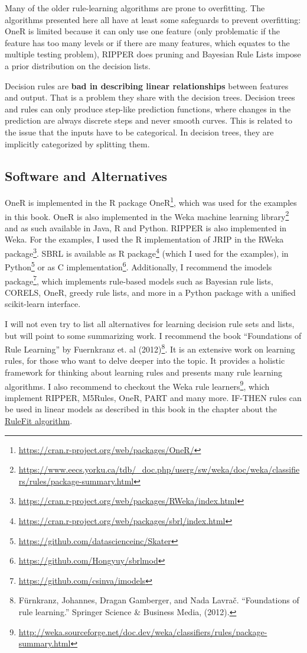 \documentclass[
  12pt,
]{krantz}
\renewcommand{\href}[2]{#2\footnote{\url{#1}}}
\begin{document}
Many of the older rule-learning algorithms are prone to overfitting.
The algorithms presented here all have at least some safeguards to prevent overfitting:
OneR is limited because it can only use one feature (only problematic if the feature has too many levels or if there are many features, which equates to the multiple testing problem), RIPPER does pruning and Bayesian Rule Lists impose a prior distribution on the decision lists.

Decision rules are \textbf{bad in describing linear relationships} between features and output.
That is a problem they share with the decision trees.
Decision trees and rules can only produce step-like prediction functions, where changes in the prediction are always discrete steps and never smooth curves.
This is related to the issue that the inputs have to be categorical.
In decision trees, they are implicitly categorized by splitting them.

\hypertarget{software-and-alternatives}{%
\subsection{Software and Alternatives}\label{software-and-alternatives}}

OneR is implemented in the \href{https://cran.r-project.org/web/packages/OneR/}{R package OneR}, which was used for the examples in this book.
OneR is also implemented in the \href{https://www.eecs.yorku.ca/tdb/_doc.php/userg/sw/weka/doc/weka/classifiers/rules/package-summary.html}{Weka machine learning library} and as such available in Java, R and Python.
RIPPER is also implemented in Weka. For the examples, I used the R implementation of JRIP in the \href{https://cran.r-project.org/web/packages/RWeka/index.html}{RWeka package}.
SBRL is available as \href{https://cran.r-project.org/web/packages/sbrl/index.html}{R package} (which I used for the examples), in \href{https://github.com/datascienceinc/Skater}{Python} or as \href{https://github.com/Hongyuy/sbrlmod}{C implementation}.
Additionally, I recommend the \href{https://github.com/csinva/imodels}{imodels package}, which implements rule-based models such as Bayesian rule lists, CORELS, OneR, greedy rule lists, and more in a Python package with a unified scikit-learn interface.

I will not even try to list all alternatives for learning decision rule sets and lists, but will point to some summarizing work.
I recommend the book ``Foundations of Rule Learning'' by Fuernkranz et. al (2012)\footnote{Fürnkranz, Johannes, Dragan Gamberger, and Nada Lavrač. ``Foundations of rule learning.'' Springer Science \& Business Media, (2012).}.
It is an extensive work on learning rules, for those who want to delve deeper into the topic.
It provides a holistic framework for thinking about learning rules and presents many rule learning algorithms.
I also recommend to checkout the \href{http://weka.sourceforge.net/doc.dev/weka/classifiers/rules/package-summary.html}{Weka rule learners}, which implement RIPPER, M5Rules, OneR, PART and many more.
IF-THEN rules can be used in linear models as described in this book in the chapter about the \protect\hyperlink{rulefit}{RuleFit algorithm}.
\end{document}
